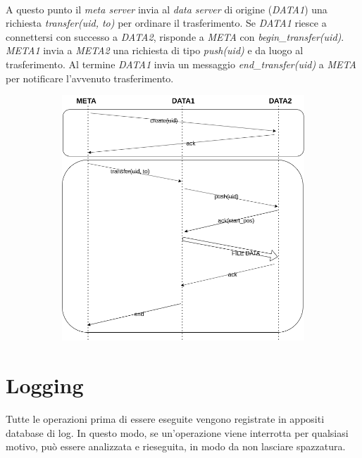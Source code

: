 \documentclass[11pt,a4paper,english]{article}
\begin{document}
\paragraph{} A questo punto il \emph{meta server} invia al \emph{data server} di origine (\emph{DATA1}) una richiesta \emph{transfer(uid, to)} per ordinare il trasferimento. Se \emph{DATA1} riesce a connettersi con successo a \emph{DATA2}, risponde a \emph{META} con \emph{begin\_transfer(uid)}. \emph{META1} invia a \emph{META2} una richiesta di tipo \emph{push(uid)} e da luogo al trasferimento. Al termine \emph{DATA1} invia un messaggio \emph{end\_transfer(uid)} a \emph{META} per notificare l'avvenuto trasferimento.


\begin{figure}[H]
	\centering
	\begin{subfigure}{0.80\linewidth}
		\includegraphics[width=\linewidth]{../diagrams/requests/transfer_request.png}
	\end{subfigure}
\end{figure}



\section{Logging}

\paragraph{} Tutte le operazioni prima di essere eseguite vengono registrate in appositi database di log. In questo modo, se un'operazione viene interrotta per qualsiasi motivo, può essere analizzata e rieseguita, in modo da non lasciare spazzatura. 
\end{document}
